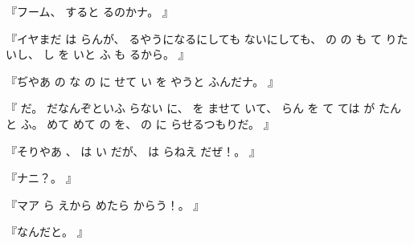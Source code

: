 『フーム、
すると
るのかナ。
』

『イヤまだ
は
らんが、
るやうになるにしても
ないにしても、
の
の
も
て
りたいし、
し
を
いと
ふ
も
るから。
』

『ぢやあ
の
な
の
に
せて
い
を
やうと
ふんだナ。
』

『
だ。
だなんぞといふ
らない
に、
を
ませて
いて、
らん
を
て
ては
が
たんと
ふ。
めて
めて
の
を、
の
に
らせるつもりだ。
』

『そりやあ
、
は
い
だが、
は
らねえ
だぜ！。
』

『ナニ？。
』

『マア
ら
えから
めたら
からう！。
』

『なんだと。
』
